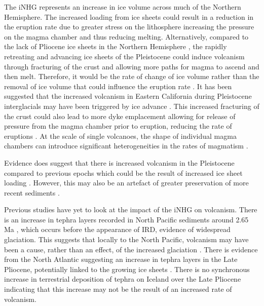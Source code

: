 The iNHG represents an increase in ice volume across much of the Northern Hemisphere. The increased loading from ice sheets could result in a reduction in the eruption rate due to greater stress on the lithosphere increasing the pressure on the magma chamber and thus reducing melting. Alternatively, compared to the lack of Pliocene ice sheets in the Northern Hemisphere \citep{hillCharacterizingIceSheets2007}, the rapidly retreating and advancing ice sheets of the Pleistocene could induce volcanism through fracturing of the crust and allowing more paths for magma to ascend and then melt. Therefore, it would be the rate of change of ice volume rather than the removal of ice volume that could influence the eruption rate \citep{jellinekDidMeltingGlaciers2004}. It has been suggested that the increased volcanism in Eastern California during Pleistocene interglacials may have been triggered by ice advance \citep{glaznerFireIceAnticorrelation1999}. This increased fracturing of the crust could also lead to more dyke emplacement allowing for release of pressure from the magma chamber prior to eruption, reducing the rate of eruptions \citep{sigmundssonClimateEffectsVolcanism2010}. At the scale of single volcanoes, the shape of individual magma chambers can introduce significant heterogeneities in the rates of magmatism \citep{sigmundssonMultipleEffectsIce2012}.

Evidence does suggest that there is increased volcanism in the Pleistocene compared to previous epochs which could be the result of increased ice sheet loading \citep{kennettGlobalIncreaseQuaternary1975}. However, this may also be an artefact of greater preservation of more recent sediments \citep{hawkesworthMatterPreservation2009}. 

Previous studies have yet to look at the impact of the iNHG on volcanism.  There is an increase in tephra layers recorded in North Pacific sediments around 2.65 Ma \citep{prueherRapidOnsetGlacial1998, prueherVolcanicTriggeringLate2001}, which occurs before the appearance of IRD, evidence of widespread glaciation. This suggests that locally to the North Pacific, volcanism may have been a cause, rather than an effect, of the increased glaciation \citep{prueherRapidOnsetGlacial1998}. There is evidence from the North Atlantic suggesting an increase in tephra layers in the Late Pliocene, potentially linked to the growing ice sheets \citep{lacasseEnhancedAirborneDispersal2002}. There is no synchronous increase in terrestrial deposition of tephra on Iceland over the Late Pliocene \citep{geirsdottirGrowthIntermittentIce1994} indicating that this increase may not be the result of an increased rate of volcanism.

